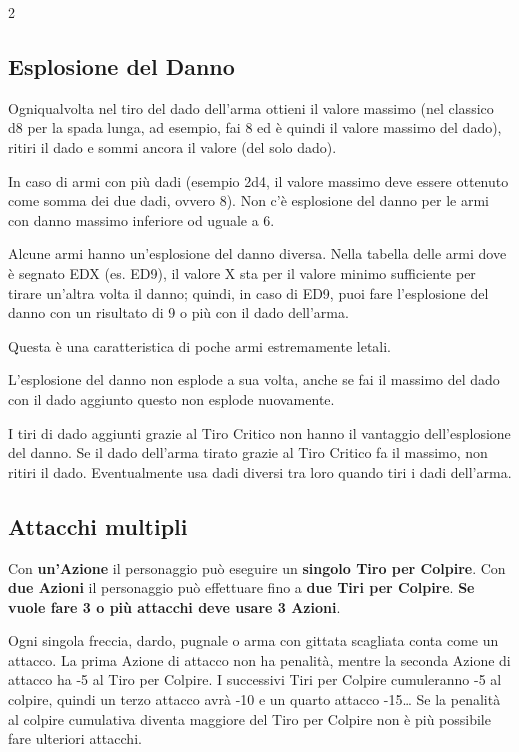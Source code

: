 \begin{multicols}{2}
\subsection{Esplosione del Danno}\label{esplosionedeldanno}

Ogniqualvolta nel tiro del dado dell'arma ottieni il valore massimo (nel classico d8 per la spada lunga, ad esempio, fai 8 ed è quindi il valore massimo del dado), ritiri il dado e sommi ancora il valore (del solo dado).

In caso di armi con più dadi (esempio 2d4, il valore massimo deve essere ottenuto come somma dei due dadi, ovvero 8). Non c'è esplosione del danno per le armi con danno massimo inferiore od uguale a 6.

Alcune armi hanno un'esplosione del danno diversa. Nella tabella delle armi dove è segnato EDX (es. ED9), il valore X sta per il valore minimo sufficiente per tirare un'altra volta il danno; quindi, in caso di ED9, puoi fare l'esplosione del danno con un risultato di 9 o più con il dado dell'arma.

Questa è una caratteristica di poche armi estremamente letali.

L'esplosione del danno non esplode a sua volta, anche se fai il massimo del dado con il dado aggiunto questo non esplode nuovamente.

I tiri di dado aggiunti grazie al Tiro Critico non hanno il vantaggio dell'esplosione del danno. Se il dado dell'arma tirato grazie al Tiro Critico fa il massimo, non ritiri il dado. Eventualmente usa dadi diversi tra loro quando tiri i dadi dell'arma.


\subsection{Attacchi multipli}\label{attacchimultiplimischia}\hypertarget{attacchimultiplimischia}{}
Con \textbf{un'Azione} il personaggio può eseguire un \textbf{singolo Tiro per Colpire}.
Con \textbf{due Azioni} il personaggio può effettuare fino a \textbf{due Tiri per Colpire}. \textbf{Se vuole fare 3 o più attacchi deve usare 3 Azioni}.

Ogni singola freccia, dardo, pugnale o arma con gittata scagliata conta come un attacco.
La prima Azione di attacco non ha penalità, mentre la seconda Azione di attacco ha -5 al Tiro per Colpire. I successivi Tiri per Colpire cumuleranno -5 al colpire, quindi un terzo attacco avrà -10 e un quarto attacco -15…
Se la penalità al colpire cumulativa diventa maggiore del Tiro per Colpire non è più possibile fare ulteriori attacchi.


\end{multicols}
